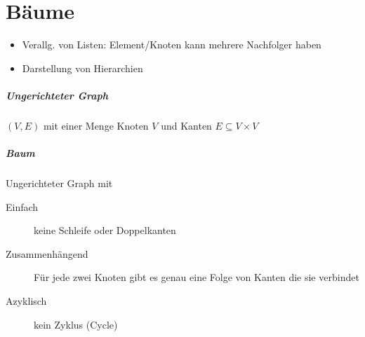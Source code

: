\chapter{Bäume}

\begin{itemize}
  \item Verallg. von Listen: Element/Knoten kann mehrere Nachfolger haben
  \item Darstellung von Hierarchien
\end{itemize}

\paragraph{Ungerichteter Graph}
$(V, E)$ mit einer Menge Knoten $V$ und Kanten $E \subseteq V \times V$

\paragraph{Baum}
Ungerichteter Graph mit

\begin{description}
  \item [Einfach] keine Schleife
        oder Doppelkanten

  \item [Zusammenhängend]
        Für jede zwei Knoten gibt es genau eine Folge von Kanten die sie verbindet

  \item [Azyklisch]
        kein Zyklus (Cycle)
\end{description}

